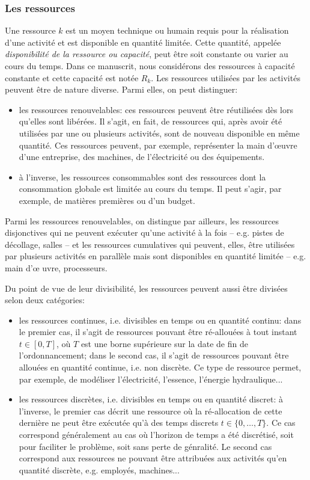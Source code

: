 \subsubsection{Les ressources}

Une ressource $k$ est un moyen technique ou humain requis pour la
réalisation d'une activité et est disponible en quantité
limitée. Cette quantité, appelée {\it disponibilité de la ressource ou
  capacité}, peut être soit constante ou varier au cours du
temps. Dans ce manuscrit, nous considérons des ressources à capacité
constante et cette capacité est notée $R_k$. Les ressources utilisées
par les activités peuvent être de nature diverse. Parmi elles, on peut
distinguer:
\begin{itemize}
\item les ressources renouvelables: ces ressources peuvent être
réutilisées dès lors qu'elles sont libérées. Il s'agit, en fait, de
ressources qui, après avoir été utilisées par une ou plusieurs
activités, sont de nouveau disponible en même quantité. Ces ressources
peuvent, par exemple, représenter la main d'\oe uvre d'une entreprise,
des machines, de l'électricité ou des équipements.
\item à l'inverse, les ressources consommables sont des ressources
dont la consommation globale est limitée au cours du temps. Il peut
s'agir, par exemple, de matières premières ou d'un budget.
\end{itemize}

Parmi les ressources renouvelables, on distingue par ailleurs, les
ressources disjonctives qui ne peuvent exécuter qu'une activité à la
fois -- e.g. pistes de décollage, salles -- et les ressources cumulatives
qui peuvent, elles,  être utilisées par plusieurs activités en
parallèle mais sont disponibles en quantité limitée -- e.g. main d'\oe
uvre,
processeurs.


Du point de vue de leur divisibilité, les ressources peuvent aussi
être divisées selon deux catégories: 
\begin{itemize}
\item les ressources continues, i.e. divisibles en temps ou en
  quantité continu: dans le premier cas, il s'agit de ressources
  pouvant être ré-allouées à tout instant $t \in [0,T]$, où $T$ est une
  borne supérieure sur la date de fin de l'ordonnancement; dans le
  second cas, il s'agit de ressources pouvant être allouées en quantité
  continue, i.e. non discrète. Ce type de ressource permet, par
  exemple, de modéliser l'électricité, l'essence, l'énergie hydraulique...
\item les ressources discrètes, i.e. divisibles en temps ou en quantité
  discret: à l'inverse, le premier cas décrit une ressource où la
  ré-allocation de cette dernière ne peut être 
  exécutée qu'à des temps discrets $t \in \{0,\dots,T\}$. Ce cas
  correspond généralement au cas où l'horizon de temps a été
  discrétisé, soit pour faciliter le problème, soit sans perte de
génralité. Le second cas correspond aux ressources ne pouvant être
attribuées aux activités qu'en quantité discrète, e.g. employés,
machines...
\end{itemize}

